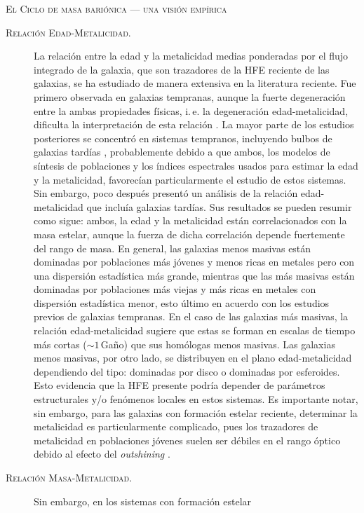 \documentclass[xcolor=dvipsnames,4pt,hyperref={colorlinks,citecolor=black,linkcolor=black,urlcolor=black}]{beamer}
\begin{document}
\begin{frame}[allowframebreaks]{\textsc{El Ciclo de masa bariónica --- una visión empírica}}
\begin{description}
%
\item[\textsc{Relación Edad-Metalicidad.}] La relación entre la edad y la metalicidad medias
ponderadas por el flujo integrado de la galaxia, que son trazadores de la HFE reciente de las
galaxias, se ha estudiado de manera extensiva en la literatura reciente. Fue primero observada en
galaxias tempranas, aunque la fuerte degeneración entre la ambas propiedades físicas, i.\,e. la
degeneración edad-metalicidad, dificulta la interpretación de esta relación \citep{Worthey1994}. La
mayor parte de los estudios posteriores se concentró en sistemas tempranos, incluyendo bulbos de
galaxias tardías \citep{Proctor2002, Terlevich2002}, probablemente debido a que ambos, los modelos
de síntesis de poblaciones y los índices espectrales usados para estimar la edad y la metalicidad,
favorecían particularmente el estudio de estos sistemas.
%
Sin embargo, poco después \citet{Gallazzi2005} presentó un análisis de la relación edad-metalicidad
que incluía galaxias tardías. Sus resultados se pueden resumir como sigue: ambos, la edad y la
metalicidad están correlacionados con la masa estelar, aunque la fuerza de dicha correlación depende
fuertemente del rango de masa. En general, las galaxias menos masivas están dominadas por
poblaciones más jóvenes y menos ricas en metales pero con una dispersión estadística más grande,
mientras que las más masivas están dominadas por poblaciones más viejas y más ricas en metales con
dispersión estadística menor, esto último en acuerdo con los estudios previos de galaxias tempranas.
En el caso de las galaxias más masivas, la relación edad-metalicidad sugiere que estas se forman en
escalas de tiempo más cortas ($\sim1\,$Gaño) que sus homólogas menos masivas.
Las galaxias menos masivas, por otro lado, se distribuyen en el plano edad-metalicidad dependiendo
del tipo: dominadas por disco o dominadas por esferoides. Esto evidencia que la HFE presente podría
depender de parámetros estructurales y/o fenómenos locales en estos sistemas.
Es importante notar, sin embargo, para las galaxias con formación estelar reciente, determinar la
metalicidad es particularmente complicado, pues los trazadores de metalicidad en poblaciones jóvenes
suelen ser débiles en el rango óptico debido al efecto del \emph{outshining}
\citep[e.\,g.,][]{Conroy2013a}.
%
\item[\textsc{Relación Masa-Metalicidad.}] Sin embargo, en los sistemas con formación estelar

\end{description}
\end{frame}
\end{document}
